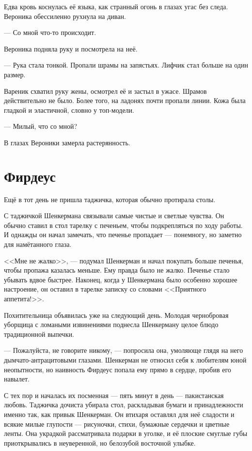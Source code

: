\documentclass[a4paper,10pt,fleqn]{book}\usepackage{polyglossia}\setdefaultlanguage{english}\setotherlanguage{russian}\defaultfontfeatures{Ligatures=TeX,Mapping=tex-text} \usepackage{xcolor}\definecolor{lightgray}{HTML}{bbbbbb}\color{lightgray}\newcommand{\ml}[3]{\textcolor{black}{#3}}
\begin{document}
Едва кровь коснулась её языка, как странный огонь в глазах угас без следа.
Вероника обессиленно рухнула на диван.

--- Со мной что-то происходит.

Вероника подняла руку и посмотрела на неё.

--- Рука стала тонкой.
Пропали шрамы на запястьях.
Лифчик стал больше на один размер.

Вареник схватил руку жены, осмотрел её и застыл в ужасе.
Шрамов действительно не было.
Более того, на ладонях почти пропали линии.
Кожа была гладкой и эластичной, словно у топ-модели.

--- Милый, что со мной?

В глазах Вероники замерла растерянность.

\section{Фирдеус}

Ещё в тот день не пришла таджичка, которая обычно протирала столы.

С таджичкой Шенкермана связывали самые чистые и светлые чувства.
Он обычно ставил в стол тарелку с печеньем, чтобы подкрепляться по ходу работы.
И однажды он начал замечать, что печенье пропадает --- понемногу, но заметно для намётанного глаза.

<<Мне не жалко>>, --- подумал Шенкерман и начал покупать больше печенья, чтобы пропажа казалась меньше.
Ему правда было не жалко.
Печенье стало убывать вдвое быстрее.
Наконец, когда у Шенкермана было особенно хорошее настроение, он оставил в тарелке записку со словами <<Приятного аппетита!>>.

Похитительница объявилась уже на следующий день.
Молодая чернобровая уборщица с ломаными извинениями поднесла Шенкерману целое блюдо традиционной выпечки.

--- Пожалуйста, не говорите никому, --- попросила она, умоляюще глядя на него дымчато-антрацитовыми глазами.
Шенкерман не относил себя к любителям юной неопытности, но наивность Фирдеус попала ему прямо в сердце, пробив его навылет.

С тех пор и началась их посменная --- пять минут в день --- пакистанская любовь.
Таджичка дочиста убирала стол, раскладывая бумаги и принадлежности именно так, как привык Шенкерман.
Он втихаря оставлял для неё сладости и всякие милые глупости --- рисуночки, стихи, бумажные сердечки и цветные ленты.
Она украдкой рассматривала подарки в уголке, и её плоские смуглые губы приоткрывались в неуверенной, но белозубой восточной улыбке.
\end{document}
